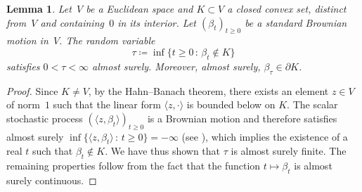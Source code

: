 \documentclass[10pt,a4paper]{amsart}
\newcommand{\iy}{\infty}
\newcommand{\scalar}[2]{\langle #1 , #2\rangle}
\renewcommand{\geq}{\geqslant}
\newtheorem{lemma}[theorem]{Lemma}
\begin{document}
\begin{lemma} \label{lemme:hahn-banach}
Let~$V$ be a Euclidean space and $K \subset V$ a closed convex set, distinct from~$V$ and containing~$0$ in its interior. Let $(\beta_t)_{t \geq 0}$ be a standard Brownian motion in~$V$. The random variable
\[ \tau \coloneqq \inf \{ t \geq 0 \, : \, \beta_t \not \in K \} \]
satisfies $0 < \tau < \infty$ almost surely. Moreover, almost surely, $\beta_\tau \in \partial K$.
\end{lemma}
 
\begin{proof}
Since $K \neq V$, by the Hahn--Banach theorem, there exists an element $z \in V$ of norm~$1$ such that the linear form $\scalar{z}{\cdot}$ is bounded below on $K$. The scalar stochastic process $(\scalar{z}{\beta_t})_{t \geq 0}$ is a Brownian motion and therefore satisfies almost surely $\inf \{ \scalar{z}{\beta_t} \, : \, t \geq 0 \}= - \iy$ (see \cite[Corollary 2.3]{LeGall13}), which implies the existence of a real $t$ such that $\beta_t \not \in K$. We have thus shown that $\tau$ is almost surely finite. The remaining properties follow from the fact that the function $t \mapsto \beta_t$ is almost surely continuous.
\end{proof}
 
\end{document}

